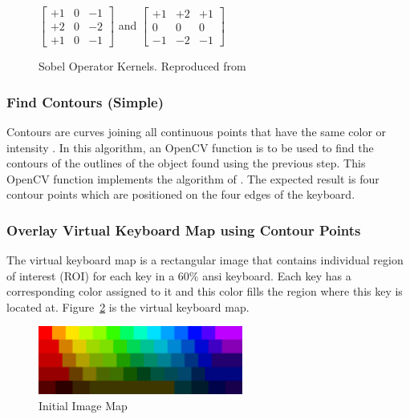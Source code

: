 \documentclass{report}
\begin{document}
\begin{figure}[H]
	\centering
  $\begin{bmatrix}
  +1 & 0 & -1\\
  +2 & 0 & -2\\
  +1 & 0 & -1
  \end{bmatrix}$
	and
  $\begin{bmatrix}
  +1 & +2 & +1\\
  0 & 0 & 0\\
  -1 & -2 & -1
  \end{bmatrix}$
	\caption{Sobel Operator Kernels. Reproduced from }
	\label{fig:metho-algo-key-sobel}
\end{figure}


\subsubsection{Find Contours (Simple)}
\label{section:metho-algo-key-contours}
Contours are curves joining all continuous points that have the same color or
intensity \parencite{opencv-contours}. In this algorithm, an OpenCV function is
to be used to find the contours of the outlines of the object found using the
previous step. This OpenCV function implements the algorithm of \cite{contours}.
The expected result is four contour points which are positioned on the four
edges of the keyboard.

\subsubsection{Overlay Virtual Keyboard Map using Contour Points}
The virtual keyboard map is a rectangular image that contains individual region
of interest (ROI) for each key in a 60\% \ac{ansi} keyboard. Each key has a
corresponding color assigned to it and this color fills the region where this
key is located at. Figure~\ref{fig:metho-algo-key-map} is the virtual keyboard
map.

\begin{figure}[H]
	\centering
	\includegraphics[width=0.6\textwidth]{image-map.png}
	\caption{Initial Image Map}
	\label{fig:metho-algo-key-map}
	\centering
\end{figure}
\end{document}
